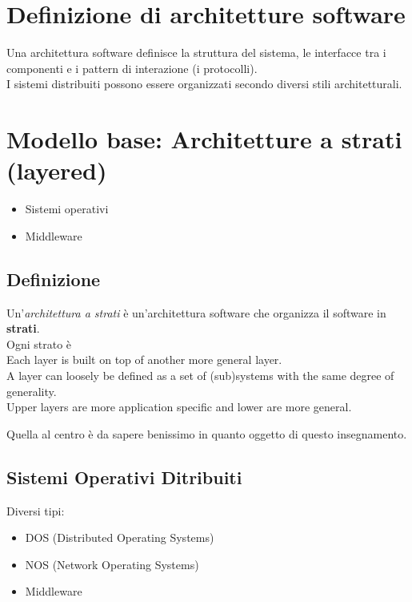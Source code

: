 \section{Definizione di architetture software}
Una architettura software definisce la struttura del sistema, le interfacce tra i componenti e i pattern di interazione (i protocolli). 
\\I sistemi distribuiti possono essere organizzati secondo diversi stili architetturali.

\section{Modello base: Architetture a strati (layered)}
\begin{itemize}
    \item Sistemi operativi
    \item Middleware
\end{itemize}
\subsection{Definizione}
Un'\textit{architettura a strati} è un'architettura software che organizza il software in \textbf{strati}.
\\Ogni strato è 
\\Each layer is built on top of another more general layer.
\\A layer can loosely be defined as a set of (sub)systems with the same degree of generality.
\\Upper layers are more application specific and lower are more general.

Quella al centro è da sapere benissimo in quanto oggetto di questo insegnamento.

\subsection{Sistemi Operativi Ditribuiti}
Diversi tipi: 
\begin{itemize}
    \item DOS (Distributed Operating Systems)
    \item NOS (Network Operating Systems)
    \item Middleware
\end{itemize}

